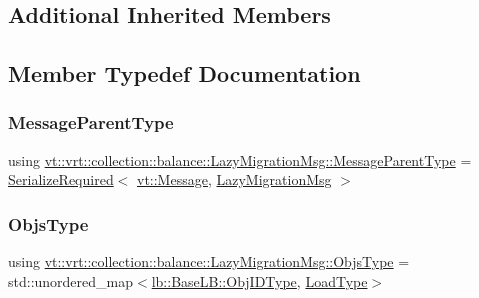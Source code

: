 \subsection*{Additional Inherited Members}


\subsection{Member Typedef Documentation}
\mbox{\label{structvt_1_1vrt_1_1collection_1_1balance_1_1_lazy_migration_msg_ae85922f15b423b53083cccda06ef0b45}} 
\subsubsection{\texorpdfstring{Message\+Parent\+Type}{MessageParentType}}
{\footnotesize\ttfamily using \hyperlink{structvt_1_1vrt_1_1collection_1_1balance_1_1_lazy_migration_msg_ae85922f15b423b53083cccda06ef0b45}{vt\+::vrt\+::collection\+::balance\+::\+Lazy\+Migration\+Msg\+::\+Message\+Parent\+Type} =  \hyperlink{namespacevt_a9e60e2e8929828639383ac1d6643384d}{Serialize\+Required}$<$ \hyperlink{namespacevt_a3a3ddfef40b4c90915fa43cdd5f129ea}{vt\+::\+Message}, \hyperlink{structvt_1_1vrt_1_1collection_1_1balance_1_1_lazy_migration_msg}{Lazy\+Migration\+Msg} $>$}

\mbox{\label{structvt_1_1vrt_1_1collection_1_1balance_1_1_lazy_migration_msg_a887ad37dade7ba6fe34e93510cf9cef3}} 
\subsubsection{\texorpdfstring{Objs\+Type}{ObjsType}}
{\footnotesize\ttfamily using \hyperlink{structvt_1_1vrt_1_1collection_1_1balance_1_1_lazy_migration_msg_a887ad37dade7ba6fe34e93510cf9cef3}{vt\+::vrt\+::collection\+::balance\+::\+Lazy\+Migration\+Msg\+::\+Objs\+Type} =  std\+::unordered\+\_\+map$<$\hyperlink{structvt_1_1vrt_1_1collection_1_1lb_1_1_base_l_b_a790b22acf448880599724749cdc4e9b3}{lb\+::\+Base\+L\+B\+::\+Obj\+I\+D\+Type}, \hyperlink{namespacevt_a8fb51741340b87d7aaee0bef60e9896b}{Load\+Type}$>$}



